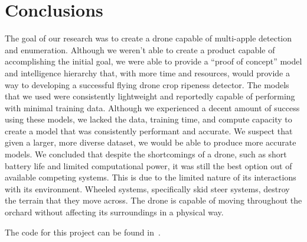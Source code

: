 \section{Conclusions}
The goal of our research was to create a drone capable of multi-apple detection and enumeration.
Although we weren't able to create a product capable of accomplishing the initial goal, we were able to provide a ``proof of concept'' model and intelligence hierarchy that, with more time and resources, would provide a way to developing a successful flying drone crop ripeness detector.
The models that we used were consistently lightweight and reportedly capable of performing with minimal training data. 
Although we experienced a decent amount of success using these models, we lacked the data, training time, and compute capacity to create a model that was consistently performant and accurate.
We suspect that given a larger, more diverse dataset, we would be able to produce more accurate models. 
We concluded that despite the shortcomings of a drone, such as short battery life and limited computational power, it was still the best option out of available competing systems.
This is due to the limited nature of its interactions with its environment.
Wheeled systems, specifically skid steer systems, destroy the terrain that they move across. 
The drone is capable of moving throughout the orchard without affecting its surroundings in a physical way.

The code for this project can be found in~\cite{FruitFly}.
